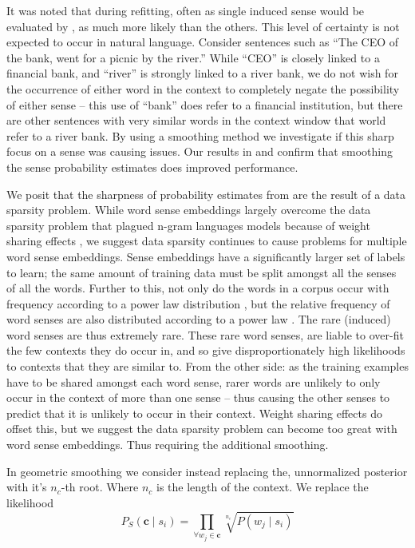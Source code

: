\documentclass{sig-alternate}
\renewcommand{\c}{\mathbf{c}}
\begin{document}
It was noted that during refitting, often as single induced sense would be evaluated by , as much more likely than the others. This level of certainty is not expected to occur in natural language. Consider sentences such as \enquote{The CEO of the bank, went for a picnic by the river.} While \enquote{CEO} is closely linked to a financial bank, and \enquote{river} is strongly linked to a river bank, we do not wish for the occurrence of either word in the context to completely negate the possibility of either sense -- this use of \enquote{bank} does refer to a financial institution, but there are other sentences with very similar words in the context window that world refer to a river bank.
By using a smoothing method we investigate if this sharp focus on a sense was causing issues.
Our results in  and  confirm that smoothing the sense probability estimates does improved performance.

We posit that the sharpness of probability estimates from  are the result of a data sparsity problem. While word sense embeddings largely overcome the data sparsity problem that plagued n-gram languages models because of weight sharing effects \textcite{NPLM}, we suggest data sparsity continues to cause problems for multiple word sense embeddings. Sense embeddings have a significantly larger set of labels to learn; the same amount of training data must be split amongst all the senses of all the words. Further to this, not only do the words in a corpus occur with frequency according to a power law distribution \parencite{zipf1949human},  but the relative frequency of word senses are also distributed according to a power law \parencite{Kilgarriff2004}. The rare (induced) word senses are thus extremely rare. These rare word senses, are liable to over-fit the few contexts they do occur in, and so give disproportionately high likelihoods to contexts that they are similar to. From the other side: as the training examples have to be shared amongst each word sense, rarer words are unlikely to only occur in the context of more than one sense -- thus causing the other senses to predict that it is unlikely to occur in their context. Weight sharing effects do offset this, but we suggest the data sparsity problem can become too great with word sense embeddings. Thus requiring the additional smoothing.


In geometric smoothing we consider instead replacing the, unnormalized posterior  with it's $n_c$-th root.
Where $n_c$ is the length of the context.
We replace the likelihood 
\begin{equation} \label{eq:contrextprobsmooth}
P_S(\c \mid s_{i})=\prod_{\forall w_{j}\in\c}\sqrt[n_c]{P(w_{j} \mid s_{i})}
\end{equation}
\end{document}
